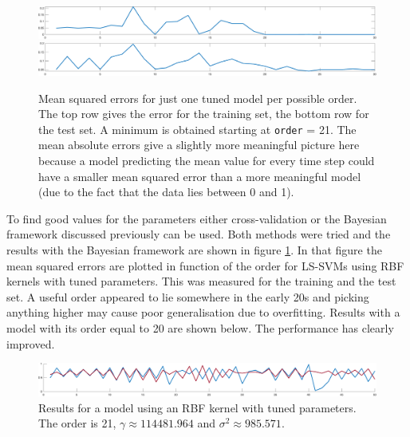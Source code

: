 \begin{figure}[!h]
\centering
\includegraphics[width=\textwidth]{../src/figures/logmap/mseval}
\includegraphics[width=\textwidth]{../src/figures/logmap/msetest}
\caption{Mean squared errors for just one tuned model per possible order. The top row gives the error for the training set, the bottom row for the test set. A minimum is obtained starting at \texttt{order} = 21. The mean absolute errors give a slightly more meaningful picture here because a model predicting the mean value for every time step could have a smaller mean squared error than a more meaningful model (due to the fact that the data lies between 0 and 1).}
\label{logmapord}
\end{figure}

To find good values for the parameters either cross-validation or the Bayesian framework discussed previously can be used. Both methods were tried and the results with the Bayesian framework are shown in figure \ref{logmapord}. In that figure the mean squared errors are plotted in function of the order for LS-SVMs using RBF kernels with tuned parameters. This was measured for the training and the test set. A useful order appeared to lie somewhere in the early 20s and picking anything higher may cause poor generalisation due to overfitting. Results with a model with its order equal to 20 are shown below. The performance has clearly improved.

\begin{figure}[!h]
\centering
\includegraphics[width=\textwidth]{../src/figures/logmap/final}
\caption{Results for a model using an RBF kernel with tuned parameters. The order is 21, $\gamma\approx 114481.964$ and $\sigma^2\approx 985.571$.}
\label{logmapfinal}
\end{figure}


